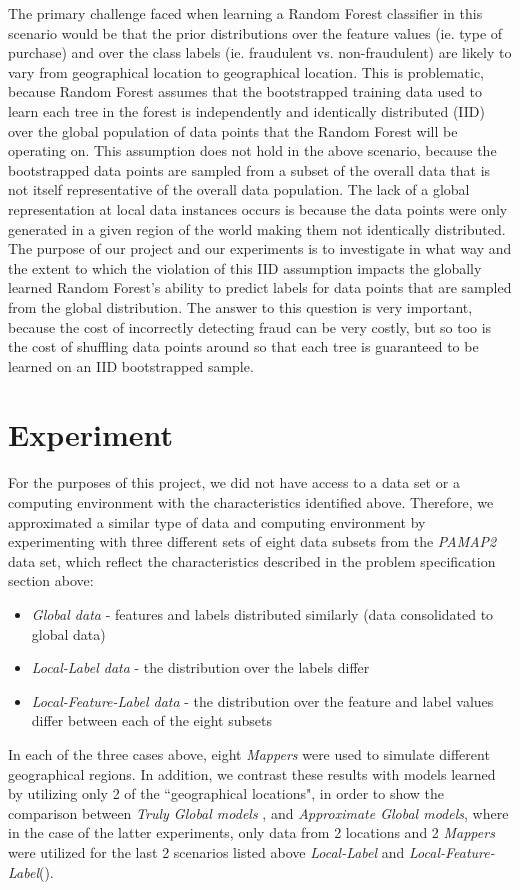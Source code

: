 \documentclass{sig-alternate-05-2015}
\begin{document}
The primary challenge faced when learning a Random Forest classifier in this scenario would be that the prior distributions over the feature values (ie. type of purchase) and over the class labels (ie. fraudulent vs. non-fraudulent) are likely to vary from geographical location to geographical location. This is problematic, because Random Forest assumes that the bootstrapped training data used to learn each tree in the forest is independently and identically distributed (IID) over the global population of data points that the Random Forest will be operating on. This assumption does not hold in the above scenario, because the bootstrapped data points are sampled from a subset of the overall data that is not itself representative of the overall data population. The lack of a global representation at local data instances occurs is because the data points were only generated in a given region of the world making them not identically distributed. The purpose of our project and our experiments is to investigate in what way and the extent to which the violation of this IID assumption impacts the globally learned Random Forest's ability to predict labels for data points that are sampled from the global distribution. The answer to this question is very important, because the cost of incorrectly detecting fraud can be very costly, but so too is the cost of shuffling data points around so that each tree is guaranteed to be learned on an IID bootstrapped sample.

\section{Experiment}
For the purposes of this project, we did not have access to a data set or a computing environment with the characteristics identified above. Therefore, we approximated a similar type of data and computing environment by experimenting with three different sets of eight data subsets from the \textit{PAMAP2} data set, which reflect the characteristics described in the problem specification section above:
\begin{itemize}
\item \textit{Global data} -  features and  labels distributed similarly (data consolidated to global data)
\item \textit{Local-Label data} - the distribution over the labels differ
\item \textit{Local-Feature-Label data} - the distribution over the feature and label values differ between each of the eight subsets
\end{itemize} 
In each of the three cases above, eight \textit{Mappers} were used to simulate different geographical regions. In addition, we contrast these results with models learned by utilizing only 2 of the ``geographical locations", in order to show the comparison between \textit{Truly Global models} , and \textit{Approximate Global models}, where in the case of the latter experiments, only data from 2 locations and 2 \textit{Mappers} were utilized for the last 2 scenarios listed above \textit{Local-Label} and \textit{Local-Feature-Label}().
\end{document}
